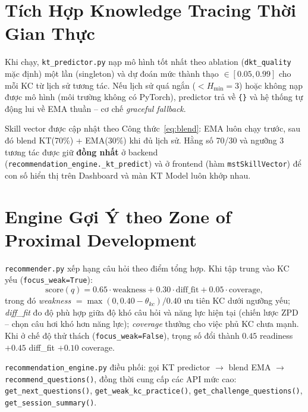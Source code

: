 \documentclass[12pt, a4paper]{report}
\begin{document}
\section{Tích Hợp Knowledge Tracing Thời Gian Thực}
\label{sec:kt_runtime}

Khi chạy, \texttt{kt\_predictor.py} nạp mô hình tốt nhất theo ablation (\texttt{dkt\_quality} mặc định) một lần (singleton) và dự đoán mức thành thạo $\in [0.05, 0.99]$ cho mỗi KC từ lịch sử tương tác. Nếu lịch sử quá ngắn ($< H_{\min}=3$) hoặc không nạp được mô hình (môi trường không có PyTorch), predictor trả về \texttt{\{\}} và hệ thống tự động lui về EMA thuần -- cơ chế \textit{graceful fallback}.

Skill vector được cập nhật theo Công thức~\eqref{eq:blend}: EMA luôn chạy trước, sau đó blend KT(70\%) + EMA(30\%) khi đủ lịch sử. Hằng số 70/30 và ngưỡng 3 tương tác được giữ \textbf{đồng nhất} ở backend (\texttt{recommendation\_engine.\_kt\_predict}) và ở frontend (hàm \texttt{mstSkillVector}) để con số hiển thị trên Dashboard và màn KT Model luôn khớp nhau.

\section{Engine Gợi Ý theo Zone of Proximal Development}
\label{sec:recsys_impl}

\texttt{recommender.py} xếp hạng câu hỏi theo điểm tổng hợp. Khi tập trung vào KC yếu (\texttt{focus\_weak=True}):
\begin{equation}
  \text{score}(q) = 0.65 \cdot \text{weakness} + 0.30 \cdot \text{diff\_fit} + 0.05 \cdot \text{coverage},
  \label{eq:rec_weak}
\end{equation}
trong đó \textit{weakness} $= \max(0, 0.40 - \theta_{kc})/0.40$ ưu tiên KC dưới ngưỡng yếu; \textit{diff\_fit} đo độ phù hợp giữa độ khó câu hỏi và năng lực hiện tại (chiến lược ZPD -- chọn câu hơi khó hơn năng lực); \textit{coverage} thưởng cho việc phủ KC chưa mạnh. Khi ở chế độ thử thách (\texttt{focus\_weak=False}), trọng số đổi thành $0.45$ readiness $+ 0.45$ diff\_fit $+ 0.10$ coverage.

\texttt{recommendation\_engine.py} điều phối: gọi KT predictor $\to$ blend EMA $\to$ \texttt{recommend\_questions()}, đồng thời cung cấp các API mức cao: \texttt{get\_next\_questions()}, \texttt{get\_weak\_kc\_practice()}, \texttt{get\_challenge\_questions()}, \texttt{get\_session\_summary()}.
\end{document}
